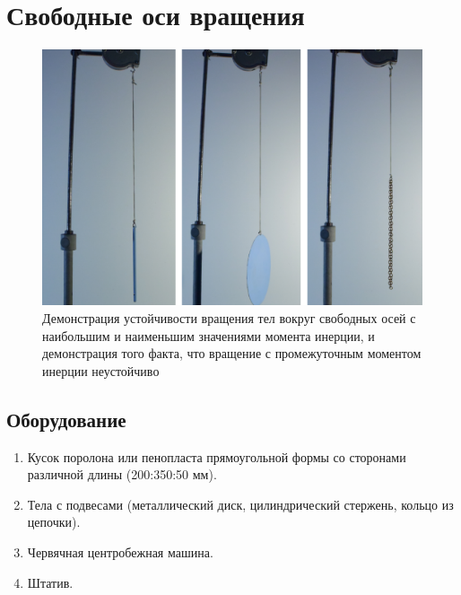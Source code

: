 \documentclass[All.tex]{subfiles}
\begin{document}


	\section{Свободные оси вращения}


\begin{figure}[H] 	%
	\centering 		%
	\includegraphics[width=0.9\linewidth]{freeaxis-1.png}
	\caption{Демонстрация устойчивости вращения тел вокруг свободных осей с наибольшим и наименьшим значениями момента инерции, и демонстрация того факта, что вращение с промежуточным моментом инерции неустойчиво}
	\label{freeaxis-1}
\end{figure}

\subsection*{\textcolor{PineGreen}{Оборудование}}

\begin{enumerate}
	\item Кусок поролона или пенопласта прямоугольной формы со сторонами различной длины (200:350:50 мм).
	\item Тела с подвесами (металлический диск, цилиндрический стержень, кольцо из цепочки).
	\item Червячная центробежная машина.
	\item Штатив.
\end{enumerate}
\end{document}
